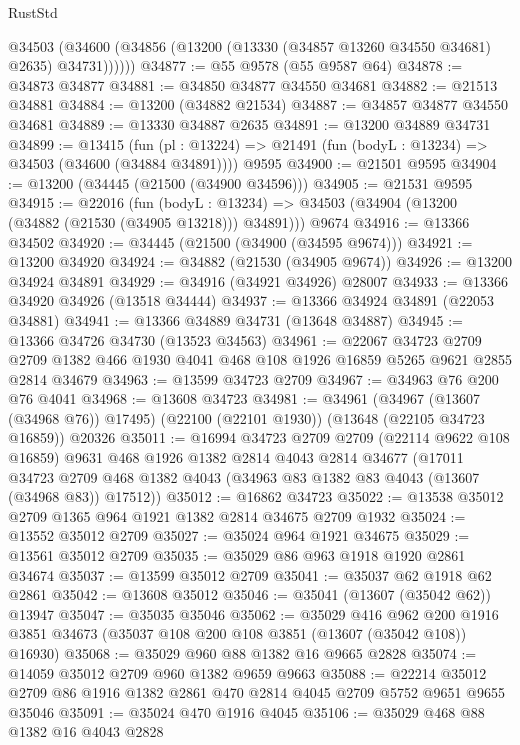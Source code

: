 \begin{lexlean}{RustStd}
\begin{coremodule}
        @34503 (@34600 (@34856 (@13200 (@13330 (@34857 @13260 @34550 @34681) @2635) @34731))))))
@34877 := @55 @9578 (@55 @9587 @64)
@34878 := @34873 @34877
@34881 := @34850 @34877 @34550 @34681
@34882 := @21513 @34881
@34884 := @13200 (@34882 @21534)
@34887 := @34857 @34877 @34550 @34681
@34889 := @13330 @34887 @2635
@34891 := @13200 @34889 @34731
@34899 := @13415
    (fun (pl : @13224) => @21491 (fun (bodyL : @13234) => @34503 (@34600 (@34884 @34891))))
    @9595
@34900 := @21501 @9595
@34904 := @13200 (@34445 (@21500 (@34900 @34596)))
@34905 := @21531 @9595
@34915 := @22016
    (fun (bodyL : @13234) => @34503 (@34904 (@13200 (@34882 (@21530 (@34905 @13218))) @34891)))
    @9674
@34916 := @13366 @34502
@34920 := @34445 (@21500 (@34900 (@34595 @9674)))
@34921 := @13200 @34920
@34924 := @34882 (@21530 (@34905 @9674))
@34926 := @13200 @34924 @34891
@34929 := @34916 (@34921 @34926) @28007
@34933 := @13366 @34920 @34926 (@13518 @34444)
@34937 := @13366 @34924 @34891 (@22053 @34881)
@34941 := @13366 @34889 @34731 (@13648 @34887)
@34945 := @13366 @34726 @34730 (@13523 @34563)
@34961 := @22067
    @34723
    @2709
    @2709
    @1382
    @466
    @1930
    @4041
    @468
    @108
    @1926
    @16859
    @5265
    @9621
    @2855
    @2814
    @34679
@34963 := @13599 @34723 @2709
@34967 := @34963 @76 @200 @76 @4041
@34968 := @13608 @34723
@34981 := @34961
    (@34967 (@13607 (@34968 @76)) @17495)
    (@22100 (@22101 @1930))
    (@13648 (@22105 @34723 @16859))
    @20326
@35011 := @16994
    @34723
    @2709
    @2709
    (@22114 @9622 @108 @16859)
    @9631
    @468
    @1926
    @1382
    @2814
    @4043
    @2814
    @34677
    (@17011 @34723 @2709 @468 @1382 @4043 (@34963 @83 @1382 @83 @4043 (@13607 (@34968 @83)) @17512))
@35012 := @16862 @34723
@35022 := @13538 @35012 @2709 @1365 @964 @1921 @1382 @2814 @34675 @2709 @1932
@35024 := @13552 @35012 @2709
@35027 := @35024 @964 @1921 @34675
@35029 := @13561 @35012 @2709
@35035 := @35029 @86 @963 @1918 @1920 @2861 @34674
@35037 := @13599 @35012 @2709
@35041 := @35037 @62 @1918 @62 @2861
@35042 := @13608 @35012
@35046 := @35041 (@13607 (@35042 @62)) @13947
@35047 := @35035 @35046
@35062 := @35029
    @416
    @962
    @200
    @1916
    @3851
    @34673
    (@35037 @108 @200 @108 @3851 (@13607 (@35042 @108)) @16930)
@35068 := @35029 @960 @88 @1382 @16 @9665 @2828
@35074 := @14059 @35012 @2709 @960 @1382 @9659 @9663
@35088 := @22214 @35012 @2709 @86 @1916 @1382 @2861 @470 @2814 @4045 @2709 @5752 @9651 @9655 @35046
@35091 := @35024 @470 @1916 @4045
@35106 := @35029
    @468
    @88
    @1382
    @16
    @4043
    @2828

\end{coremodule}
\end{lexlean}
